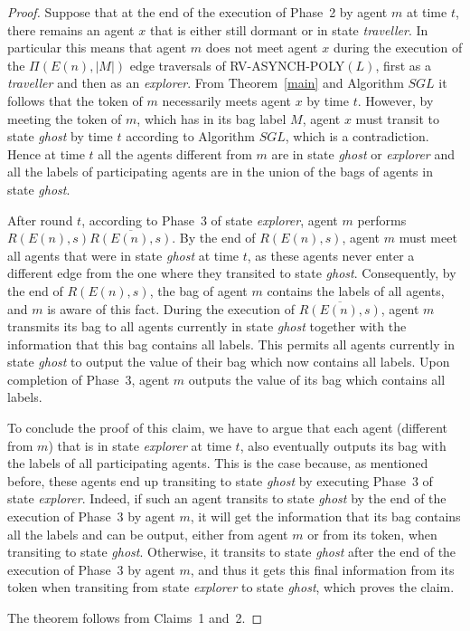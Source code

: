 \documentclass [11pt] {article}
\begin{document}
\begin{proof}
{Suppose that at the end of the execution of Phase~2 by agent $m$ at time $t$, there remains an agent $x$ that is either still dormant or in state {\em traveller}. In particular this means that agent $m$ does not meet agent $x$ during the execution of the $\Pi(E(n),|M|)$ edge traversals of RV-ASYNCH-POLY$(L)$, first as a {\em traveller} and then as an {\em explorer}. From Theorem~\ref{main} and Algorithm $SGL$ it follows that the token of $m$ necessarily meets agent $x$ by time $t$. However, by meeting the token of $m$, which has in its bag label $M$, agent $x$ must transit to state {\em ghost} by time $t$ according to Algorithm $SGL$, which is a contradiction. Hence at time $t$ all the agents different from $m$ are in state {\em ghost} or {\em explorer} and all the labels of participating agents are in the union of the bags of agents in state {\em ghost}.}

{After round $t$, according to Phase~3 of state {\em explorer}, agent $m$ performs $R(E(n),s)\overline{R(E(n),s)}$. By the end of $R(E(n),s)$, agent $m$ must meet all agents that
were in state {\em ghost} at time $t$, as these agents never enter a different edge from the one where they transited to state {\em ghost}. Consequently, by the end of $R(E(n),s)$, the bag of agent $m$
contains the labels of all agents, and $m$ is aware of this fact. 
During the execution of $\overline{R(E(n),s)}$, agent $m$ transmits its bag to all agents currently in state {\em ghost} together with the information
that this bag contains all labels. 
This permits all agents currently in state {\em ghost} to output the value of their bag which now contains all labels. 
Upon completion of Phase~3, agent
$m$ outputs the value of its bag which contains all labels.}

{To conclude the proof of this claim, we have to argue that each agent (different from $m$) that is in state {\em explorer} at time $t$, also eventually outputs its bag with the labels of all participating agents. This is the case because, as mentioned before, these agents end up transiting to state {\em ghost} by executing Phase~3 of state {\em explorer}. Indeed, if such an agent transits to state {\em ghost} by the end of the execution of Phase~3 by agent $m$, it will get the information that its bag contains all the labels and can be output, either from agent $m$ or from its token, when transiting to state {\em ghost}. Otherwise, it transits to state {\em ghost} after the end of the execution of Phase~3 by agent $m$, and thus it gets this final information from its token when transiting from state {\em explorer} to state {\em ghost}, which proves the claim.}

{The theorem follows from Claims~1 and~2.}
\end{proof}
\end{document}
